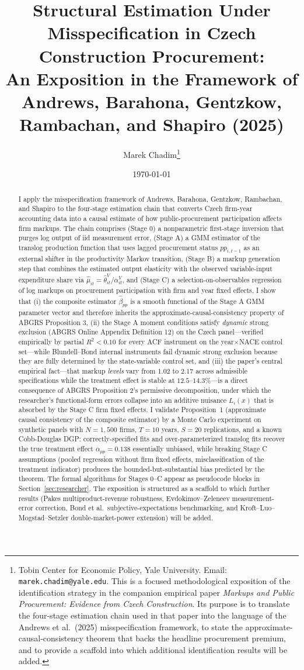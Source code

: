 \documentclass[11pt]{article}
\title{Structural Estimation Under Misspecification in Czech Construction Procurement:\\
An Exposition in the Framework of Andrews, Barahona, Gentzkow, Rambachan, and Shapiro (2025)}
\author{Marek Chadim\thanks{Tobin Center for Economic Policy, Yale University. Email: \texttt{marek.chadim@yale.edu}. This is a focused methodological exposition of the identification strategy in the companion empirical paper \emph{Markups and Public Procurement: Evidence from Czech Construction}. Its purpose is to translate the four-stage estimation chain used in that paper into the language of the Andrews et al.\ (2025) misspecification framework, to state the approximate-causal-consistency theorem that backs the headline procurement premium, and to provide a scaffold into which additional identification results will be added.}}
\date{\today}
\begin{document}
\maketitle

\begin{abstract}
\noindent I apply the misspecification framework of Andrews, Barahona, Gentzkow, Rambachan, and Shapiro \citep{ABGRS2025} to the four-stage estimation chain that converts Czech firm-year accounting data into a causal estimate of how public-procurement participation affects firm markups. The chain comprises (Stage 0) a nonparametric first-stage inversion that purges log output of iid measurement error, (Stage A) a GMM estimator of the translog production function that uses lagged procurement status $pp_{i,t-1}$ as an external shifter in the productivity Markov transition, (Stage B) a markup generation step that combines the estimated output elasticity with the observed variable-input expenditure share via $\hat\mu_{it} = \hat\theta^V_{it}/\alpha^V_{it}$, and (Stage C) a selection-on-observables regression of log markups on procurement participation with firm and year fixed effects. I show that (i) the composite estimator $\hat\beta_{pp}$ is a smooth functional of the Stage A GMM parameter vector and therefore inherits the approximate-causal-consistency property of ABGRS Proposition 3, (ii) the Stage A moment conditions satisfy \emph{dynamic} strong exclusion (ABGRS Online Appendix Definition 12) on the Czech panel---verified empirically by partial $R^2 < 0.10$ for every ACF instrument on the year$\times$NACE control set---while Blundell--Bond internal instruments fail dynamic strong exclusion because they are fully determined by the state-variable control set, and (iii) the paper's central empirical fact---that markup \emph{levels} vary from $1.02$ to $2.17$ across admissible specifications while the treatment effect is stable at $12.5$--$14.3\%$---is a direct consequence of ABGRS Proposition 2's permissive decomposition, under which the researcher's functional-form errors collapse into an additive nuisance $L_i(x)$ that is absorbed by the Stage C firm fixed effects. I validate Proposition~1 (approximate causal consistency of the composite estimator) by a Monte Carlo experiment on synthetic panels with $N=1{,}500$ firms, $T=10$ years, $S=20$ replications, and a known Cobb-Douglas DGP: correctly-specified fits and over-parameterized translog fits recover the true treatment effect $\alpha_{pp}=0.138$ essentially unbiased, while breaking Stage C assumptions (pooled regression without firm fixed effects, misclassification of the treatment indicator) produces the bounded-but-substantial bias predicted by the theorem. The formal algorithms for Stages 0--C appear as pseudocode blocks in Section~\ref{sec:researcher}. The exposition is structured as a scaffold to which further results (Pakes multiproduct-revenue robustness, Evdokimov--Zeleneev measurement-error correction, Bond et al.\ subjective-expectations benchmarking, and Kroft--Luo--Mogstad--Setzler double-market-power extension) will be added.
\end{abstract}
\end{document}
